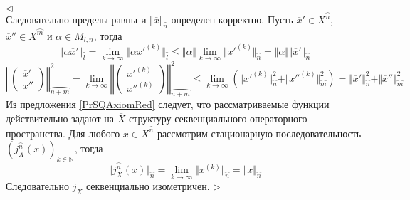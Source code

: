 \documentclass[12pt]{article}
\newenvironment{proof}{\par $\triangleleft$}{$\triangleright$}
\begin{document}
\begin{proof}
$$$$
Следовательно пределы равны и $\Vert \overline{x}\Vert_{\wideparen{n}}$ определен корректно. Пусть $\overline{x}'\in X^{\wideparen{n}}$, $\overline{x}''\in X^{\wideparen{m}}$ и $\alpha\in M_{l,n}$, тогда
$$
\Vert\alpha\overline{x}'\Vert_{\wideparen{l}}
=\lim\limits_{k\to\infty}\Vert\alpha x'^{(k)}\Vert_{\wideparen{l}}
\leq\Vert\alpha\Vert\lim\limits_{k\to\infty}\Vert x'^{(k)}\Vert_{\wideparen{n}}
=\Vert\alpha\Vert\Vert\overline{x}'\Vert_{\wideparen{n}}
$$
$$
\left\Vert\begin{pmatrix} \overline{x}'\\ \overline{x}''\end{pmatrix}\right\Vert_{\wideparen{n+m}}^2
=\lim\limits_{k\to\infty}\left\Vert\begin{pmatrix} x'^{(k)}\\ x''^{(k)}\end{pmatrix}\right\Vert_{\wideparen{n+m}}^2
\leq\lim\limits_{k\to\infty}(\Vert x'^{(k)}\Vert_{\wideparen{n}}^2+\Vert x''^{(k)}\Vert_{\wideparen{m}}^2)
=\Vert\overline{x}'\Vert_{\wideparen{n}}^2+\Vert\overline{x}''\Vert_{\wideparen{m}}^2
$$
Из предложения \ref{PrSQAxiomRed} следует, что рассматриваемые функции действительно задают на $\overline{X}$ структуру секвенциального операторного пространства. Для любого $x\in X^{\wideparen{n}}$ рассмотрим стационарную последовательность 
$(j_X^{\wideparen{n}}(x))_{k\in\mathbb{N}}$, тогда
$$
\Vert j_X^{\wideparen{n}}(x)\Vert_{\wideparen{n}}
=\lim\limits_{k\to\infty}\Vert x^{(k)}\Vert_{\wideparen{n}}
=\Vert x\Vert_{\wideparen{n}}
$$
Следовательно $j_X$ секвенциально изометричен.
\end{proof}
\end{document}
